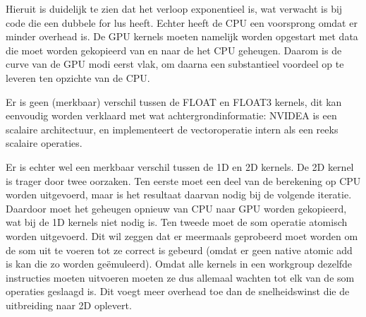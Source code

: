\documentclass[a4paper]{article}
\begin{document}
\begin{figure}[H]
\end{figure}

Hieruit is duidelijk te zien dat het verloop exponentieel is, wat verwacht is bij code die een dubbele for lus heeft. Echter heeft de CPU een voorsprong omdat er minder overhead is. De GPU kernels moeten namelijk worden opgestart met data die moet worden gekopieerd van en naar de het CPU geheugen. Daarom is de curve van de GPU modi eerst vlak, om daarna een substantieel voordeel op te leveren ten opzichte van de CPU.

Er is geen (merkbaar) verschil tussen de FLOAT en FLOAT3 kernels, dit kan eenvoudig worden verklaard met wat achtergrondinformatie: NVIDEA is een scalaire architectuur, en implementeert de vectoroperatie intern als een reeks scalaire operaties.

Er is echter wel een merkbaar verschil tussen de 1D en 2D kernels. De 2D kernel is trager door twee oorzaken. Ten eerste moet een deel van de berekening op CPU worden uitgevoerd, maar is het resultaat daarvan nodig bij de volgende iteratie. Daardoor moet het geheugen opnieuw van CPU naar GPU worden gekopieerd, wat bij de 1D kernels niet nodig is.
Ten tweede moet de som operatie atomisch worden uitgevoerd. Dit wil zeggen dat er meermaals geprobeerd moet worden om de som uit te voeren tot ze correct is gebeurd (omdat er geen native atomic add is kan die zo worden geëmuleerd). Omdat alle kernels in een workgroup dezelfde instructies moeten uitvoeren moeten ze dus allemaal wachten tot elk van de som operaties geslaagd is. Dit voegt meer overhead toe dan de snelheidswinst die de uitbreiding naar 2D oplevert.
\end{document}
